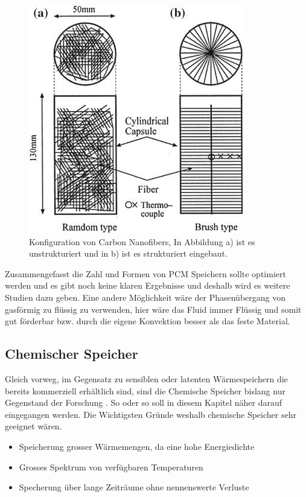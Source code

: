 \documentclass[11pt,a4paper]{scrartcl}
\begin{document}
\begin{figure}[h!]
\begin{center}
\includegraphics[scale=0.5]{images/configurationofthecarbonnanofibers.jpg}
\caption{Konfiguration von Carbon Nanofibers, In Abbildung a) ist es unstrukturiert und in b) ist es strukturiert eingebaut. \cite{WasteEnergyHarvesting}}
\label{fig:configurationofthecarbonnanofibers}
\end{center}
\end{figure}

Zusammengefasst die Zahl und Formen von PCM Speichern sollte optimiert werden
und es gibt noch keine klaren Ergebnisse und deshalb wird es weitere Studien
dazu geben.
Eine andere Möglichkeit wäre der Phasenübergang von gasförmig zu flüssig zu
verwenden, hier wäre das Fluid immer Flüssig und somit gut förderbar bzw. durch
die eigene Konvektion besser als das feste Material.


\subsection{Chemischer Speicher}
Gleich vorweg, im Gegensatz zu sensiblen oder latenten Wärmespeichern die
bereits kommerziell erhältlich sind, sind die Chemische Speicher bislang nur
Gegenstand der Forschung \cite{gegenstandderforschung}. So oder so soll in
diesem Kapitel näher darauf eingegangen werden. Die Wichtigsten Gründe weshalb
chemische Speicher sehr geeignet wären.
\begin{itemize}
\item Speicherung grosser Wärmemengen, da eine hohe Energiedichte 
\item Grosses Spektrum von verfügbaren Temperaturen
\item Specherung über lange Zeiträume ohne nennenswerte Verluste
\end{itemize}
\end{document}
